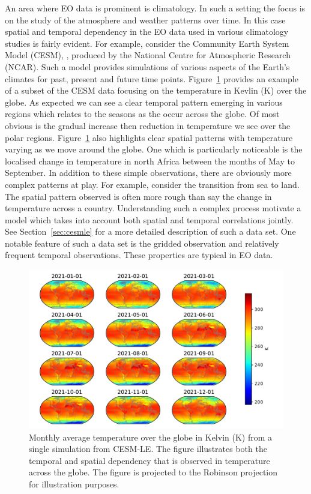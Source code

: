 An area where EO data is prominent is climatology.
In such a setting the focus is on the study of the atmosphere and weather patterns over time.
In this case spatial and temporal dependency in the EO data used in various climatology studies is fairly evident.
For example, consider the Community Earth System Model (CESM), \citep{kay_community_2015}, produced by the National Centre for Atmospheric Research (NCAR).
Such a model provides simulations of various aspects of the Earth's climates for past, present and future time points.
Figure~\ref{fig:cesm_example} provides an example of a subset of the CESM data focusing on the temperature in Kevlin ($\si{\kelvin}$) over the globe.
As expected we can see a clear temporal pattern emerging in various regions which relates to the seasons as the occur across the globe. 
Of most obvious is the gradual increase then reduction in temperature we see over the polar regions.
Figure~\ref{fig:cesm_example} also highlights clear spatial patterns with temperature varying as we move around the globe.
One which is particularly noticeable is the localised change in temperature in north Africa between the months of May to September.
In addition to these simple observations, there are obviously more complex patterns at play. 
For example, consider the transition from sea to land.
The spatial pattern observed is often more rough than say the change in temperature across a country. 
Understanding such a complex process motivate a model which takes into account both spatial and temporal correlations jointly. 
See Section~\ref{sec:cesmle} for a more detailed description of such a data set.
One notable feature of such a data set is the gridded observation and relatively frequent temporal observations. 
These properties are typical in EO data. 



\begin{figure}[htbp!] 
	\centering    
	\includegraphics[width=1.0\textwidth]{cesm_temp_example}
	\caption[Average monthly temperature from CESM-LE]{Monthly average temperature over the globe in Kelvin ($\si{\kelvin}$) from a single simulation from CESM-LE. The figure illustrates both the temporal and spatial dependency that is observed in temperature across the globe. The figure is projected to the Robinson projection for illustration purposes.}
	\label{fig:cesm_example}
\end{figure}

